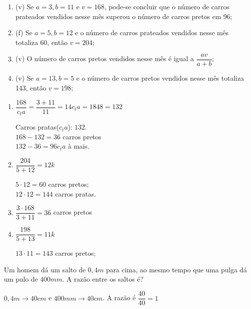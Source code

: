 \begin{multicols}{2}
	\begin{enumerate}[label=\alph*)]
		\item (v) Se $ a = 3, b = 11 $ e $ v = 168 $, pode-se concluir que o número de carros prateados vendidos nesse mês superou o número de carros pretos em 96;
		\item (f) Se $ a = 5, b = 12 $ e o número de carros prateados vendidos nesse mês totaliza 60, então $ v = 204 $;
		\item (v) O número de carros pretos vendidos nesse mês é igual a $ \dfrac{av}{a+b} $;
		\item (v) Se $ a = 13, b = 5 $ e o número de carros pretos vendidos nesse mês totaliza 143, então $ v = 198 $;
	\end{enumerate}

	\columnbreak
	\begin{enumerate}[label=\alph*)]
	\item $ \dfrac{168}{c_ta} = \dfrac{3+11}{11} = 14c_ta = 1848 = 132$
	
	Carros pratas($ c_ta $): $132$.\\ $168-132 = 36$ carros pretos\\ $ 132 - 36 = 96c_ta$ à mais.
	
	\item $ \dfrac{204}{5+12} = 12k$
	
	$5 \cdot 12 = 60$ carros pretos;\\
	$12 \cdot 12 = 144$ carros pratas.
	
	\item $ \dfrac{3 \cdot 168}{3+11} = 36$ carros pretos
	
	\item  $ \dfrac{198}{5+13} = 11k$
	
	$13 \cdot 11 = 143$ carros pretos;\\
\end{enumerate}
\end{multicols}

Um homem dá um salto de $ 0,4m $ para cima, ao mesmo tempo que uma pulga dá um pulo de $ 400mm $. A razão entre os saltos é?

$ 0,4m \longrightarrow 40cm $ e $ 400mm \longrightarrow 40cm $. A razão é $ \dfrac{40}{40} = 1 $
